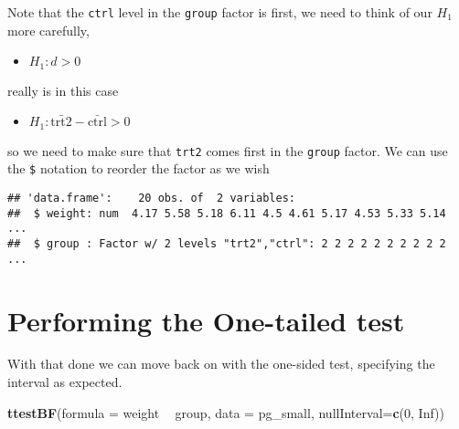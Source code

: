 \documentclass[
]{book}
\newenvironment{Shaded}{\begin{snugshade}}{\end{snugshade}}
\newcommand{\DataTypeTok}[1]{\textcolor[rgb]{0.13,0.29,0.53}{#1}}
\newcommand{\DecValTok}[1]{\textcolor[rgb]{0.00,0.00,0.81}{#1}}
\newcommand{\KeywordTok}[1]{\textcolor[rgb]{0.13,0.29,0.53}{\textbf{#1}}}
\newcommand{\NormalTok}[1]{#1}
\newcommand{\OperatorTok}[1]{\textcolor[rgb]{0.81,0.36,0.00}{\textbf{#1}}}
\newcommand{\OtherTok}[1]{\textcolor[rgb]{0.56,0.35,0.01}{#1}}
\newcommand{\StringTok}[1]{\textcolor[rgb]{0.31,0.60,0.02}{#1}}
\providecommand{\tightlist}{%
  \setlength{\itemsep}{0pt}\setlength{\parskip}{0pt}}
\begin{document}
Note that the \texttt{ctrl} level in the \texttt{group} factor is first, we need to think of our \(H_1\) more carefully,

\begin{itemize}
\tightlist
\item
  \(H_1 : d > 0\)
\end{itemize}

really is in this case

\begin{itemize}
\tightlist
\item
  \(H_1 : \bar{\text{trt2}} - \bar{\text{ctrl}} > 0\)
\end{itemize}

so we need to make sure that \texttt{trt2} comes first in the \texttt{group} factor. We can use the \texttt{\$} notation to reorder the factor as we wish

\begin{Shaded}
\end{Shaded}

\begin{verbatim}
## 'data.frame':    20 obs. of  2 variables:
##  $ weight: num  4.17 5.58 5.18 6.11 4.5 4.61 5.17 4.53 5.33 5.14 ...
##  $ group : Factor w/ 2 levels "trt2","ctrl": 2 2 2 2 2 2 2 2 2 2 ...
\end{verbatim}

\hypertarget{performing-the-one-tailed-test}{%
\section{Performing the One-tailed test}\label{performing-the-one-tailed-test}}

With that done we can move back on with the one-sided test, specifying the interval as expected.

\begin{Shaded}
\begin{Highlighting}[]
\KeywordTok{ttestBF}\NormalTok{(}\DataTypeTok{formula =}\NormalTok{  weight }\OperatorTok{~}\StringTok{ }\NormalTok{group, }\DataTypeTok{data =}\NormalTok{ pg_small, }\DataTypeTok{nullInterval=}\KeywordTok{c}\NormalTok{(}\DecValTok{0}\NormalTok{, }\OtherTok{Inf}\NormalTok{))}
\end{Highlighting}
\end{Shaded}
\end{document}
